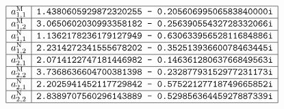 \documentclass[letterpaper]{article}
\begin{document}
\begin{table}
\begin{center}
\renewcommand{\arraystretch}{2.0}
$$\begin{array}{|c|c|}\hline
 a^{\text{\scriptsize M}}_{1,1}
 & \texttt{1.4380605929872320255 - 0.20560699506583840000i}
\\\hline
 a^{\text{\scriptsize M}}_{1,2}
 & \texttt{3.0650602030993358182 - 0.25639055432728332066i}
\\\hline
 a^{\text{\scriptsize N}}_{1,1}
 & \texttt{1.1362178236179127949 - 0.63063395652811684886i}
\\\hline
 a^{\text{\scriptsize N}}_{1,2}
 & \texttt{2.2314272341555678202 - 0.35251393660078463445i}
 \\\hline
 a^{\text{\scriptsize M}}_{2,1}
 & \texttt{2.0714122747181446982 - 0.14636128063766849563i}
\\\hline
 a^{\text{\scriptsize M}}_{2,2}
 & \texttt{3.7368636604700381398 - 0.23287793152977231173i}
\\\hline
 a^{\text{\scriptsize N}}_{2,1}
 & \texttt{2.2025941452117729842 - 0.57522127718749665852i}
\\\hline
 a^{\text{\scriptsize N}}_{2,2}
 & \texttt{2.8389707560296143889 - 0.52985636445927887339i}
\\\hline
\end{array}$$
\renewcommand{\arraystretch}{1.0}
\caption{Lowest resonant frequencies $a=\frac{\omega R}{c}$ for
         a spherical dielectric cavity of (lossless,
         frequency-independent) relative permittivity $\epsilon=4.$}
\label{ResonantFrequencyTable}
\end{center}
\end{table}

 
\newpage
\end{document}
